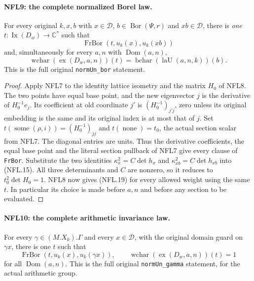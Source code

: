\paragraph{NFL9: the complete normalized Borel law.}
\label{claim:NFL9}
For every original $k,x,b$ with $x\in\mathcal D$,
$b\in\operatorname{Bor}(\Psi,r)$ and $xb\in\mathcal D$, there is
\emph{one} $t:\operatorname{Ix}(D_w)\to\mathbb C^*$ such that
\[
 \operatorname{FrBor}(t,u_k(x),u_k(xb))
\]
and, simultaneously for every $a,n$ with $\operatorname{Dom}(a,n)$,
\[
 \operatorname{wchar}(\operatorname{ex}(D_w,a,n))(t)
      =\operatorname{bchar}(\operatorname{laU}(a,n,k))(b).
 \tag{NFL.19}
\]
This is the full original \texttt{normUn\_bor} statement.

\begin{proof}
Apply NFL7 to the identity lattice isometry and the matrix $H_0$
of NFL8.  The two points have equal base point, and the new
eigenvector $j$ is the derivative of $H_0^{-1}e_j$.
Its coefficient at old coordinate $j'$ is
$(H_0^{-1})_{j'j}$, zero unless its original embedding is the
same and its original index is at most that of $j$.
Set $t(\operatorname{some}(\rho,i))=(H_0^{-1})_{jj}$ and
$t(\operatorname{none})=t_0$, the actual section scalar from NFL7.
The diagonal entries are units.  Thus the derivative coefficients,
the equal base point and the literal section pullback of NFL7
give every clause of \texttt{FrBor}.
Substitute the two identities $\kappa_x^2=C\det h_x$ and
$\kappa_{xb}^2=C\det h_{xb}$ into (NFL.15).
All three determinants and $C$ are nonzero, so it reduces to
$t_0^2\det H_0=1$.  NFL8 now gives (NFL.19) for every allowed
weight using the same $t$.  In particular its choice is made
before $a,n$ and before any section to be evaluated.
\end{proof}

\paragraph{NFL10: the complete arithmetic invariance law.}
\label{claim:NFL10}
For every $\gamma\in(M.X_k).\Gamma$ and every $x\in\mathcal D$,
with the original domain guard on $\gamma x$, there is one $t$
such that
\[
 \operatorname{FrBor}(t,u_k(x),u_k(\gamma x)),\qquad
 \operatorname{wchar}(\operatorname{ex}(D_w,a,n))(t)=1
 \tag{NFL.20}
\]
for all $\operatorname{Dom}(a,n)$.  This is the full original
\texttt{normUn\_gamma} statement, for the actual arithmetic group.

